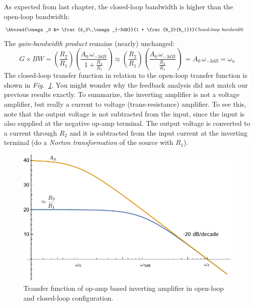 As expected from last chapter, the closed-loop bandwidth is higher than the open-loop bandwidth:
    \begin{align}
        \Aboxed{\omega_0 &= \frac{A_0\,\omega_{-3dB}}{1 + \frac{R_2}{R_1}}}
        &\textit{Closed-loop bandwidth}
    \end{align}
The \textit{gain-bandwidth product} remains (nearly) unchanged:
    \begin{equation} 
        G \times BW = \left(\frac{R_2}{R_1}\right) \left(\frac{A_0\,\omega_{-3dB}}{1 + \frac{R_2}{R_1}}\right)
        \approx \left(\frac{R_2}{R_1}\right) \left(\frac{A_0\,\omega_{-3dB}}{\frac{R_2}{R_1}}\right)\
        = \boxed{A_0\,\omega_{-3dB} = \omega_u}
    \end{equation}
The closed-loop transfer function in relation to the open-loop transfer function is shown in \emph{Fig.~\ref{fig:mag1pole_fb_label}}.  You might wonder why the feedback analysis did not match our previous results exactly.  To summarize, the inverting amplifier is not a voltage amplifier, but really a current to voltage (trans-resistance) amplifier.  To see this, note that the output voltage is not subtracted from the input, since the input is also supplied at the negative op-amp terminal. The output voltage is converted to a current through $R_2$ and it is subtracted from the input current at the inverting terminal (do a \textit{Norton transformation} of the source with $R_1$).
\begin{figure}[H]
\centering
\includegraphics[scale=0.75]{mag1pole_fb_label}
\caption{Transfer function of op-amp based inverting amplifier in open-loop and closed-loop configuration.}
\label{fig:mag1pole_fb_label}
\end{figure}

